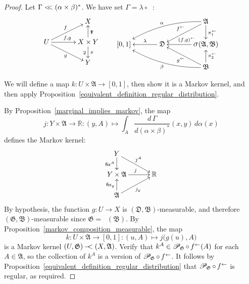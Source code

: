 \documentclass[
twoside=true,
paper=letter,
fontsize=9pt,
pagesize=auto,
leqno,
openany,
headsepline,
overfullrule,
]{scrbook}
\theoremstyle{plain}
\theoremstyle{plain}
\theoremstyle{definition}
\theoremstyle{bfnoteitalic}
\theoremstyle{bfnoteroman}
\newcommand{\sigalg}[1]{\mathfrak{#1}}
\newcommand{\cali}[1]{\mathscr{#1}}
\newcommand{\sfop}[1]{\mathsf{#1}}
\newcommand{\condprobop}[1]{\mathop{\cali{P}\hspace{-1pt}}\nolimits_{#1}}
\newcommand{\sagb}{\mathop{\hbox{\large{$\sigma$}}}\nolimits}
\newcommand{\preimage}[1]{\mathop{#1^{\leftarrow}}}
\newcommand{\R}{\mathbb{R}}
\newcommand{\sigmaalgebra}{\sigalg{A}}
\newcommand{\sigmaalgebraii}{\sigalg{B}}
\newcommand{\productsig}[2]{\sagb(#1,#2)}
\newcommand{\funcf}{f}
\newcommand{\funcg}{g}
\newcommand{\funcj}{j}
\newcommand{\funck}{k}
\newcommand{\measurespace}{X}
\newcommand{\measurespaceii}{Y}
\newcommand{\mspaceelt}{x}
\newcommand{\mspaceeltii}{y}
\newcommand{\abscont}{\mathrel{< \kern-3.5pt <}}
\newcommand{\measlambda}{\lambda}
\newcommand{\seti}{A}
\newcommand{\projectionone}{\pi_1}
\newcommand{\projectiontwo}{\pi_2}
\newcommand{\fixinthefirst}[1]{\sfop{fix}_{#1}}
\newcommand{\fixinthesecond}[1]{\sfop{fix}^{#1}}
\newcommand{\uspace}{U}%
\newcommand{\uspaceelt}{u}
\newcommand{\uspacesig}{\sigalg{D}}
\newcommand{\transition}{\,-\kern-6pt <}
\newcommand{\joint}{\Gamma}%
\newcommand{\measonprod}{\Gamma}%
\newcommand{\marginalone}{\alpha}%
\newcommand{\marginaltwo}{\beta}%
\begin{document}
\begin{proof}
Let $\joint \abscont (\marginalone\times\marginaltwo)^*$.
We have set
$\joint = \measlambda\circ\preimage{({\funcf,\funcg})}$:
\[
\xymatrix@R=16pt@C=34pt{
 & \measurespace
 \\
 \uspace
 \ar[ur]^{\funcf}
 \ar[dr]_{\funcg}
 \ar[r]^{\funcf, \funcg} &
 \measurespace \times \measurespaceii  \ar[u]_\projectionone \ar[d]^\projectiontwo
 \\
 & \measurespaceii  \\
}
\qquad
\xymatrix@R=18pt@C=34pt{
 & & \sigmaalgebra
 \ar[dl]_{\preimage{\funcf}}
 \ar[d]^{\preimage{\projectionone}}
 \ar@/_10pt/[lld]_{\marginalone}
 \\
 [0,1] & \uspacesig \ar[l]_-{\measlambda} &
 \productsig{\sigmaalgebra}{\sigmaalgebraii}
 \ar[l]_{\hskip8pt \preimage{(\funcf,\funcg)}}
 \\
 & & \sigmaalgebraii
  \ar[u]_{\preimage{\projectiontwo}}
  \ar[ul]^{\preimage{\funcg}}
  \ar@/^10pt/[llu]^{\marginaltwo}
  \\
}
\]

We will define a map
$\funck: \uspace\times \sigmaalgebra \to [0,1]$, then show it is a Markov kernel, and then apply Proposition~\ref{equivalent_definition_regular_distribution}.


By Proposition~\ref{marginal_implies_markov}, the map
\[
\funcj
:\measurespaceii\times\sigmaalgebra\to \R
:(\mspaceeltii,\seti)\mapsto
\int_\seti
\dfrac{d\,\measonprod}{d(\marginalone\times\marginaltwo)^*}
(\mspaceelt,\mspaceeltii)\, d\marginalone(\mspaceelt)
\]
defines the Markov kernel:
\[
\xymatrix@R=16pt@C=30pt{
\measurespaceii
\ar[d]_-{\fixinthesecond{\seti}}
\ar[dr]^{\funcj^\seti} &
\\
\measurespaceii\times\sigmaalgebra \ar[r]^{\funcj} & \R
\\
\sigmaalgebra
\ar[ur]_{\funcj_\mspaceeltii}
\ar[u]^{\fixinthefirst{\mspaceeltii}} &
\\
}
\]
By hypothesis, the function
$\funcg:\uspace\to\measurespace$ is $(\uspacesig,\sigmaalgebraii)$\hyp{}measurable, and therefore $(\sigalg{G}, \sigmaalgebraii)$\hyp{}measurable since
$\sigalg{G} = \preimage{\funcg}(\sigmaalgebraii)$. By Proposition~\ref{markov_composition_measurable}, the map
\[
\funck:\uspace\times\sigmaalgebra \to [0,1]
:(\uspaceelt,\seti) \mapsto \funcj \bigl( \funcg(\uspaceelt), \seti \bigr)
\]
is a Markov kernel
$(\uspace,\sigalg{G}) \transition (\measurespace, \sigmaalgebra)$.
Verify that
$\funck^\seti \in \condprobop{\sigalg{G}}\circ \preimage{\funcf}(\seti)$ for each $\seti\in\sigmaalgebra$, so the collection of $\funck^\seti$ is a version of
$\condprobop{\sigalg{G}}\circ \preimage{\funcf}$. It follows by Proposition~\ref{equivalent_definition_regular_distribution} that
$\condprobop{\sigalg{G}}\circ \preimage{\funcf}$ is regular, as required.
\end{proof}
\end{document}
